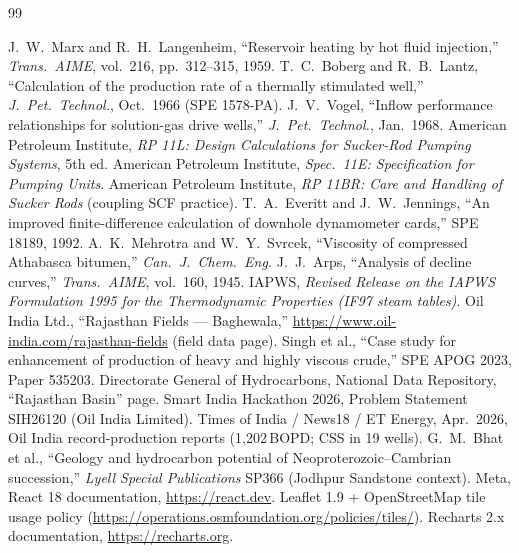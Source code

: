 \documentclass[12pt,a4paper]{report}
\begin{document}
\begin{thebibliography}{99}
 J.~W.~Marx and R.~H.~Langenheim, ``Reservoir heating by hot fluid
injection,'' \textit{Trans.\ AIME}, vol.~216, pp.~312--315, 1959.
 T.~C.~Boberg and R.~B.~Lantz, ``Calculation of the production
rate of a thermally stimulated well,'' \textit{J.\ Pet.\ Technol.}, Oct.\ 1966
(SPE 1578-PA).
 J.~V.~Vogel, ``Inflow performance relationships for
solution-gas drive wells,'' \textit{J.\ Pet.\ Technol.}, Jan.\ 1968.
 American Petroleum Institute, \textit{RP 11L: Design
Calculations for Sucker-Rod Pumping Systems}, 5th ed.
 American Petroleum Institute, \textit{Spec.\ 11E: Specification
for Pumping Units}.
 American Petroleum Institute, \textit{RP 11BR: Care and
Handling of Sucker Rods} (coupling SCF practice).
 T.~A.~Everitt and J.~W.~Jennings, ``An improved finite-difference
calculation of downhole dynamometer cards,'' SPE 18189, 1992.
 A.~K.~Mehrotra and W.~Y.~Svrcek, ``Viscosity of compressed
Athabasca bitumen,'' \textit{Can.\ J.\ Chem.\ Eng.}
 J.~J.~Arps, ``Analysis of decline curves,''
\textit{Trans.\ AIME}, vol.~160, 1945.
 IAPWS, \textit{Revised Release on the IAPWS Formulation 1995
for the Thermodynamic Properties (IF97 steam tables)}.
 Oil India Ltd., ``Rajasthan Fields --- Baghewala,''
\url{https://www.oil-india.com/rajasthan-fields} (field data page).
 Singh et al., ``Case study for enhancement of production of
heavy and highly viscous crude,'' SPE APOG 2023, Paper 535203.
 Directorate General of Hydrocarbons, National Data Repository,
``Rajasthan Basin'' page.
 Smart India Hackathon 2026, Problem Statement SIH26120
(Oil India Limited).
 Times of India / News18 / ET Energy, Apr.\ 2026, Oil India
record-production reports (1,202\,BOPD; CSS in 19 wells).
 G.~M.~Bhat et al., ``Geology and hydrocarbon potential of
Neoproterozoic--Cambrian succession,'' \textit{Lyell Special Publications}
SP366 (Jodhpur Sandstone context).
 Meta, React 18 documentation, \url{https://react.dev}.
 Leaflet 1.9 + OpenStreetMap tile usage policy
(\url{https://operations.osmfoundation.org/policies/tiles/}).
 Recharts 2.x documentation, \url{https://recharts.org}.
\end{thebibliography}

\appendix
\end{document}
